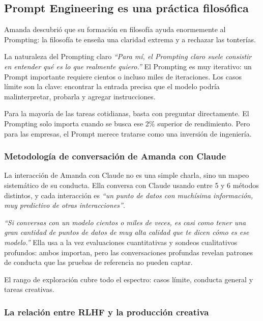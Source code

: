 \documentclass[a4paper]{article}
\begin{document}
\subsection{Prompt Engineering es una práctica filosófica}

Amanda descubrió que su formación en filosofía ayuda enormemente al Prompting: la filosofía te enseña una claridad extrema y a rechazar las tonterías.

\begin{importantbox}{La naturaleza del Prompting claro}
\textit{``Para mí, el Prompting claro suele consistir en entender qué es lo que realmente quiero.''} El Prompting es muy iterativo: un Prompt importante requiere cientos o incluso miles de iteraciones. Los casos límite son la clave: encontrar la entrada precisa que el modelo podría malinterpretar, probarla y agregar instrucciones.

Para la mayoría de las tareas cotidianas, basta con preguntar directamente. El Prompting solo importa cuando se busca ese 2\% superior de rendimiento. Pero para las empresas, el Prompt merece tratarse como una inversión de ingeniería.
\end{importantbox}

\subsubsection{Metodología de conversación de Amanda con Claude}

La interacción de Amanda con Claude no es una simple charla, sino un mapeo sistemático de su conducta. Ella conversa con Claude usando entre 5 y 6 métodos distintos, y cada interacción es \textit{``un punto de datos con muchísima información, muy predictivo de otras interacciones''}.

\textit{``Si conversas con un modelo cientos o miles de veces, es casi como tener una gran cantidad de puntos de datos de muy alta calidad que te dicen cómo es ese modelo.''} Ella usa a la vez evaluaciones cuantitativas y sondeos cualitativos profundos: ambos importan, pero las conversaciones profundas revelan patrones de conducta que las pruebas de referencia no pueden captar.

El rango de exploración cubre todo el espectro: casos límite, conducta general y tareas creativas.

\subsubsection{La relación entre RLHF y la producción creativa}
\end{document}
